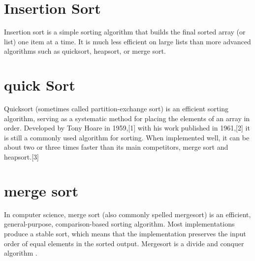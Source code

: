 \documentclass{IEEEtran}
\begin{document}
\section{Insertion Sort}
Insertion sort is a simple sorting algorithm that builds the final sorted array (or list) one item at a time. It is much less efficient on large lists than more advanced algorithms such as quicksort, heapsort, or merge sort.
\section{quick Sort}
Quicksort (sometimes called partition-exchange sort) is an efficient sorting algorithm, serving as a systematic method for placing the elements of an array in order. Developed by Tony Hoare in 1959,[1] with his work published in 1961,[2] it is still a commonly used algorithm for sorting. When implemented well, it can be about two or three times faster than its main competitors, merge sort and heapsort.[3]
\section{merge sort}
In computer science, merge sort (also commonly spelled mergesort) is an efficient, general-purpose, comparison-based sorting algorithm. Most implementations produce a stable sort, which means that the implementation preserves the input order of equal elements in the sorted output. Mergesort is a divide and conquer algorithm .
\end{document}
